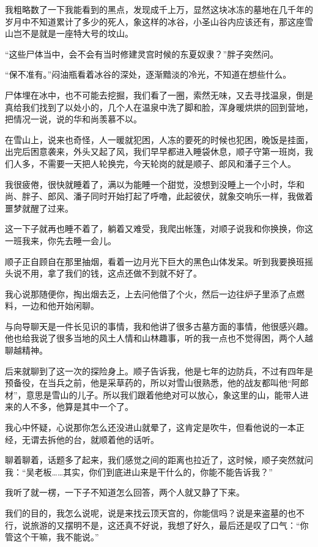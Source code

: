 我粗略数了一下我能看到的黑点，发现成千上万，显然这块冰冻的墓地在几千年的岁月中不知道累计了多少的死人，象这样的冰谷，小圣山谷内应该还有，那这座雪山岂不是就是一座特大号的坟山。

“这些尸体当中，会不会有当时修建灵宫时候的东夏奴隶？”胖子突然问。

“保不准有。”闷油瓶看着冰谷的深处，逐渐黯淡的冷光，不知道在想些什么。

尸体埋在冰中，也不可能去挖掘，我们看了一圈，索然无味，又去寻找温泉，倒是真给我们找到了以处小的，几个人在温泉中洗了脚和脸，浑身暖烘烘的回到营地，把情况一说，说的华和尚羡慕不以。

在雪山上，说来也奇怪，人一暖就犯困，人冻的要死的时候也犯困，晚饭是挂面，出完后困意袭来，外头又起了风，我们早早都进入睡袋休息，顺子守第一班岗，我们人多，不需要一天把人轮换完，今天轮岗的就是顺子、郎风和潘子三个人。

我很疲倦，很快就睡着了，满以为能睡一个甜觉，没想到没睡上一个小时，华和尚、胖子、郎风、潘子同时开始打起了呼噜，此起彼伏，就象交响乐一样，我做着噩梦就醒了过来。

这一下子就再也睡不着了，躺着又难受，我爬出帐篷，对顺子说我和你换换，你这一班我来，你先去睡一会儿。

顺子正自顾自在那里抽烟，看着一边月光下巨大的黑色山体发呆。听到我要换班摇头说不用，拿了我们的钱，这点还做不到就不好了。

我心说那随便你，掏出烟去乏，上去问他借了个火，然后一边往炉子里添了点燃料，一边和他开始闲聊。

与向导聊天是一件长见识的事情，我和他讲了很多古墓方面的事情，他很感兴趣。他也给我说了很多当地的风土人情和山林趣事，听的我一点也不觉得困，两个人越聊越精神。

后来就聊到了这一次的探险身上。顺子告诉我，他是七年的边防兵，不过有四年是预备役，在当兵之前，他是采草药的，所以对雪山很熟悉，他的战友都叫他“阿郎材”，意思是雪山的儿子。所以我们跟着他绝对可以放心，象这里的山，能带人进来的人不多，他算是其中一个了。

我心中怀疑，心说那你怎么还没进山就晕了，这肯定是吹牛，但看他说的一本正经，无谓去拆他的台，就顺着他的话听。

聊着聊着，话题多了起来，我们感觉之间的距离也拉近了，这时候，顺子突然就问我：“吴老板……其实，你们到底进山来是干什么的，你能不能告诉我？”

我听了就一楞，一下子不知道怎么回答，两个人就又静了下来。

我们的目的，我怎么说呢，说是来找云顶天宫的，你能信吗？说是来盗墓的也不行，说旅游的又摆明不是，这还真不好说，我想了好久，最后还是叹了口气：“你管这个干嘛，我不能说。”

